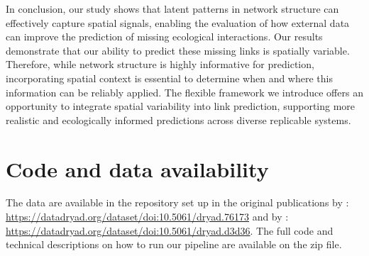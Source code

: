 \documentclass[oneside, a4paper, onecolumn, 11pt]{article}
\begin{document}
In conclusion, our study shows that latent patterns in network structure can effectively capture spatial signals, enabling the evaluation of how external data can improve the prediction of missing ecological interactions. Our results demonstrate that our ability to predict these missing links is spatially variable. Therefore, while network structure is highly informative for prediction, incorporating spatial context is essential to determine when and where this information can be reliably applied. The flexible framework we introduce offers an opportunity to integrate spatial variability into link prediction, supporting more realistic and ecologically informed predictions across diverse replicable systems. 

\section{Code and data availability}
The data are available in the repository set up in the original publications by \cite{Trojelsgaard2015-aq}: \url{https://datadryad.org/dataset/doi:10.5061/dryad.76173} and by \cite{Pilosof2013-fq}: \url{https://datadryad.org/dataset/doi:10.5061/dryad.d3d36}. 
The full code and technical descriptions on how to run our pipeline are available on the zip file.



\end{document}
